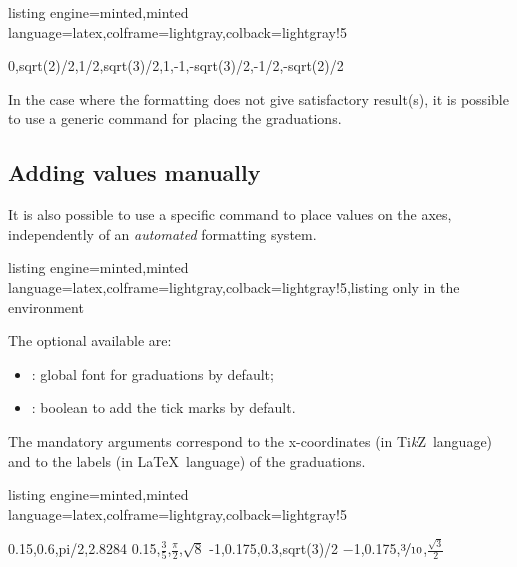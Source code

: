 \documentclass[11pt,a4paper]{ltxdoc}
\providecommand\tikzlogo{Ti\textit{k}Z}
\let\TikZ\tikzlogo
\begin{document}
\begin{tcblisting}{listing engine=minted,minted language=latex,colframe=lightgray,colback=lightgray!5}
\begin{GraphTikz}%
	[x=2.75cm,y=3cm,
	Xmin=0,Xmax=3.5,Xgrid=pi/12,Xgrids=pi/24,
	Ymin=-1.05,Ymax=1.05,Ygrid=0.2,Ygrids=0.05]
	{0,sqrt(2)/2,1/2,sqrt(3)/2,1,-1,-sqrt(3)/2,-1/2,-sqrt(2)/2}
\end{GraphTikz}
\end{tcblisting}

In the case where the formatting does not give satisfactory result(s), it is possible to use a generic command for placing the graduations.

\subsection{Adding values manually}\label{additionvals}

It is also possible to use a specific command to place values on the axes, independently of an \textit{automated} formatting system.

\begin{tcblisting}{listing engine=minted,minted language=latex,colframe=lightgray,colback=lightgray!5,listing only}
in the environment
\end{tcblisting}

The optional \MontreCode{[keys]} available are:

\smallskip

\begin{itemize}
	\item {}: global font for graduations { by default};
	\item {}: boolean to add the tick marks { by default}.
\end{itemize}

\smallskip

The mandatory arguments correspond to the x-coordinates (in \TikZ\ language) and to the labels (in \LaTeX\ language) of the graduations.

\begin{tcblisting}{listing engine=minted,minted language=latex,colframe=lightgray,colback=lightgray!5}
\begin{GraphTikz}%
	[x=2.75cm,y=3cm,
	Xmin=0,Xmax=3.5,Xgrid=pi/12,Xgrids=pi/24,
	Ymin=-1.05,Ymax=1.05,Ygrid=0.2,Ygrids=0.05]
	\DrawAxisGrids[Grads=false,Enlarge=2.5mm]{}{}
	\AddXvalues
		{0.15,0.6,pi/2,2.8284}
		{\num{0.15},$\frac35$,$\displaystyle\frac{\pi}{2}$,$\sqrt{8}$}
	\AddYvalues
		{-1,0.175,0.3,sqrt(3)/2}
		{\num{-1},\num{0.175},$\nicefrac{3}{10}$,$\frac{\sqrt{3}}{2}$}
\end{GraphTikz}
\end{tcblisting}
\end{document}
